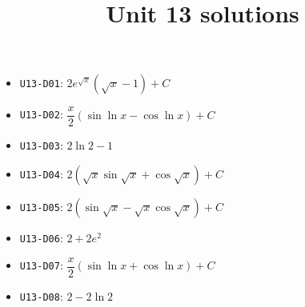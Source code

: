 
\title{Unit 13 solutions}

\maketitle
\begin{itemize}
  \item \texttt{U13-D01}: $2e^{\sqrt{x}}(\sqrt{x}-1)+C$
  \item \texttt{U13-D02}: $\dfrac{x}{2}(\sin\ln x-\cos\ln x)+C$
  \item \texttt{U13-D03}: $2\ln 2-1$
  \item \texttt{U13-D04}: $2(\sqrt{x}\sin\sqrt{x}+\cos\sqrt{x})+C$
  \item \texttt{U13-D05}: $2(\sin\sqrt{x}-\sqrt{x}\cos\sqrt{x})+C$
  \item \texttt{U13-D06}: $2+2e^{2}$
  \item \texttt{U13-D07}: $\dfrac{x}{2}(\sin\ln x+\cos\ln x)+C$
  \item \texttt{U13-D08}: $2-2\ln 2$
\end{itemize}

